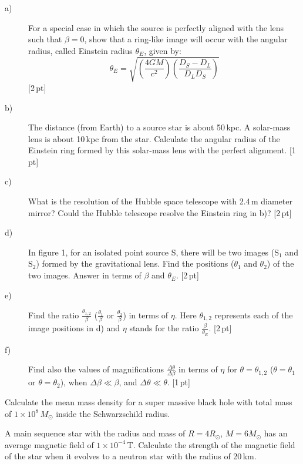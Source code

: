 \begin{description}
\item[a)] For a special case in which the source is perfectly aligned with the
  lens such that $\beta = 0$, show that a ring-like image will occur with the
  angular radius, called Einstein radius $\theta_E$, given by:
  \[ \theta_E = \sqrt{\left(\frac{4GM}{c^2}\right)
     \left(\frac{D_S - D_L}{D_L D_S}\right)} \]
  \hfill[2\,pt]
\item[b)] The distance (from Earth) to a source star is about 50\,kpc. A
  solar-mass lens is about 10\,kpc from the star. Calculate the angular radius
  of the Einstein ring formed by this solar-mass lens with the perfect
  alignment. \hfill[1\,pt]
\item[c)] What is the resolution of the Hubble space telescope with 2.4\,m
  diameter mirror? Could the Hubble telescope resolve the Einstein ring in
  b)? \hfill[2\,pt]
\item[d)] In figure 1, for an isolated point source S, there will be two
  images ($\mathrm{S}_1$ and $\mathrm{S}_2$) formed by the gravitational
  lens. Find the positions ($\theta_1$ and $\theta_2$) of the two images.
  Answer in terms of $\beta$ and $\theta_E$. \hfill[2\,pt]
\item[e)] Find the ratio $\frac{\theta_{1,2}}{\beta}$ ($\frac{\theta_1}{\beta}$
  or $\frac{\theta_2}{\beta}$) in terms of $\eta$. Here $\theta_{1,2}$
  represents each of the image positions in d) and $\eta$ stands for the ratio
  $\frac{\beta}{\theta_E}$. \hfill[2\,pt]
\item[f)] Find also the values of magnifications
  $\frac{\Delta\theta}{\Delta\beta}$ in terms of $\eta$ for
  $\theta = \theta_{1,2}$ ($\theta = \theta_1$ or $\theta = \theta_2$), when
  $\Delta\beta \ll \beta$, and $\Delta\theta \ll \theta$. \hfill[1\,pt]
\end{description}

Calculate the mean mass density for a super massive black hole with total mass
of $1 \times 10^8\,M_\odot$ inside the Schwarzschild radius.

A main sequence star with the radius and mass of $R = 4R_\odot$,
$M = 6M_\odot$ has an average magnetic field of $1 \times 10^{-4}$\,T.
Calculate the strength of the magnetic field of the star when it evolves to a
neutron star with the radius of 20\,km.

